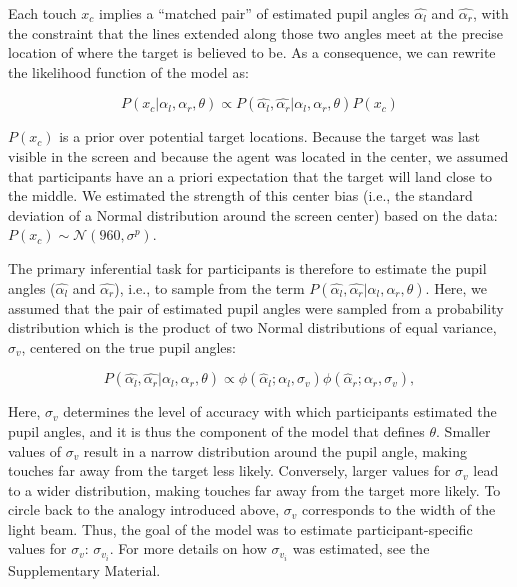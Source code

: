 \documentclass[
  man,floatsintext]{apa6}
\begin{document}
Each touch \(x_c\) implies a ``matched pair'' of estimated pupil angles \(\hat{\alpha_l}\) and \(\hat{\alpha_r}\), with the constraint that the lines extended along those two angles meet at the precise location of where the target is believed to be. As a consequence, we can rewrite the likelihood function of the model as:

\begin{equation}
P(x_c | \alpha_l, \alpha_r, \theta) \propto P(\hat{\alpha_l}, \hat{\alpha_r} | \alpha_l, \alpha_r, \theta) P(x_c)
\end{equation}

\(P(x_c)\) is a prior over potential target locations. Because the target was last visible in the screen and because the agent was located in the center, we assumed that participants have an a priori expectation that the target will land close to the middle. We estimated the strength of this center bias (i.e., the standard deviation of a Normal distribution around the screen center) based on the data: \(P(x_c) \sim \mathcal{N}(960, \sigma^p)\).

The primary inferential task for participants is therefore to estimate the pupil angles (\(\hat{\alpha_l}\) and \(\hat{\alpha_r}\)), i.e., to sample from the term \(P(\hat{\alpha_l}, \hat{\alpha_r} | \alpha_l, \alpha_r, \theta)\). Here, we assumed that the pair of estimated pupil angles were sampled from a probability distribution which is the product of two Normal distributions of equal variance, \(\sigma_v\), centered on the true pupil angles:

\begin{equation}
P(\hat{\alpha_l}, \hat{\alpha_r} | \alpha_l, \alpha_r, \theta) \propto \phi(\hat{\alpha}_l ; \alpha_l, \sigma_v)\phi(\hat{\alpha}_r ; \alpha_r, \sigma_v),
\end{equation}

Here, \(\sigma_v\) determines the level of accuracy with which participants estimated the pupil angles, and it is thus the component of the model that defines \(\theta\). Smaller values of \(\sigma_v\) result in a narrow distribution around the pupil angle, making touches far away from the target less likely. Conversely, larger values for \(\sigma_v\) lead to a wider distribution, making touches far away from the target more likely. To circle back to the analogy introduced above, \(\sigma_v\) corresponds to the width of the light beam. Thus, the goal of the model was to estimate participant-specific values for \(\sigma_v\): \(\sigma_{v_i}\). For more details on how \(\sigma_{v_i}\) was estimated, see the Supplementary Material.
\end{document}
